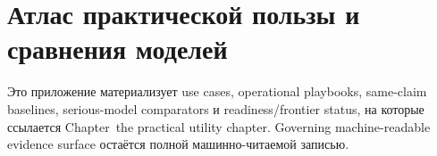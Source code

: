 \section{Атлас практической пользы и сравнения моделей}
\label{sec:oc-core-1-3-practical-utility-atlas}

Это приложение материализует use cases, operational playbooks,
same-claim baselines, serious-model comparators и readiness/frontier status,
на которые ссылается Chapter~the practical utility chapter.
Governing machine-readable evidence surface остаётся полной машинно-читаемой записью.

\begingroup
\footnotesize
\RaggedRight
\setlength{\emergencystretch}{1.2em}
\setlength{\tabcolsep}{2pt}
\setlength{\LTleft}{0pt}
\setlength{\LTright}{0pt}

\endgroup
